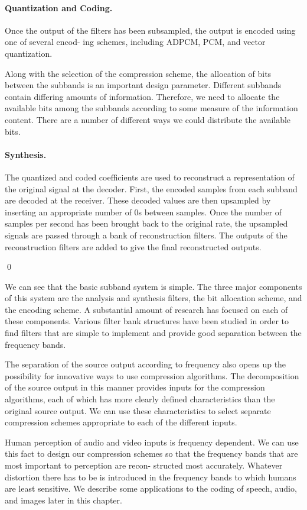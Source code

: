 \paragraph{Quantization and Coding.} Once the output of the filters has been subsampled, the output is encoded using one of several encod- ing schemes, including ADPCM, PCM, and vector quantization.

Along with the selection of the compression scheme, the allocation of bits between the subbands is an important design parameter. Different subbands contain differing amounts of information. Therefore, we need to allocate the available bits among the subbands according to some measure of the information content. There are a number of different ways we could distribute the available bits. 


\paragraph{Synthesis.} The quantized and coded coefficients are used to reconstruct a representation of the original signal at the decoder. First, the encoded samples from each subband are decoded at the receiver. These decoded values are then upsampled by inserting an appropriate number of $0$s between samples. Once the number of samples per second has been brought back to the original rate, the upsampled signals are passed through a bank of reconstruction filters. The outputs of the reconstruction filters are added to give the final reconstructed outputs.

\qed

We can see that the basic subband system is simple. The three major components of this system are the analysis and synthesis filters, the bit allocation scheme, and the encoding scheme. A substantial amount of research has focused on each of these components. Various filter bank structures have been studied in order to find filters that are simple to implement and provide good separation between the frequency bands.

The separation of the source output according to frequency also opens up the possibility for innovative ways to use compression algorithms. The decomposition of the source output in this manner provides inputs for the compression algorithms, each of which has more clearly defined characteristics than the original source output. We can use these characteristics to select separate compression schemes appropriate to each of the different inputs.

Human perception of audio and video inputs is frequency dependent. We can use this fact to design our compression schemes so that the frequency bands that are most important to perception are recon- structed most accurately. Whatever distortion there has to be is introduced in the frequency bands to which humans are least sensitive. We describe some applications to the coding of speech, audio, and images later in this chapter.


